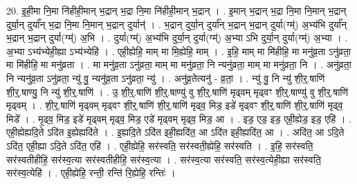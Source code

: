 \documentclass[17pt]{extarticle}
\begin{document}
20. इ॒ही॒मा नि॒मा नि॑हीही॒मान् भ॒द्रान् भ॒द्रा नि॒मा नि॑हीही॒मान् भ॒द्रान् । . इ॒मान् भ॒द्रान् भ॒द्रा नि॒मा नि॒मान् भ॒द्रान् दुर्या॒न् दुर्या᳚न् भ॒द्रा नि॒मा नि॒मान् भ॒द्रान् दुर्यान्॑ । . भ॒द्रान् दुर्या॒न् दुर्या᳚न् भ॒द्रान् भ॒द्रान् दुर्या(ग्म्॑) अ॒भ्य॑भि दुर्या᳚न् भ॒द्रान् भ॒द्रान् दुर्या(ग्म्॑) अ॒भि । . दुर्या(ग्म्॑) अ॒भ्य॑भि दुर्या॒न् दुर्या(ग्म्॑) अ॒भ्या ऽभि दुर्या॒न् दुर्या(ग्म्॑) अ॒भ्या । . अ॒भ्या ऽभ्य॑भ्येही॒ह्या ऽभ्य॑भ्येहि॑ । . एही॒ह्येहि॒ माम् मा मि॒ह्येहि॒ माम् । . इ॒हि॒ माम् मा मि॑हीहि॒ मा मनु॑व्र॒ता ऽनु॑व्रता॒ मा मि॑हीहि॒ मा मनु॑व्रता । . मा मनु॑व्र॒ता ऽनु॑व्रता॒ माम् मा मनु॑व्रता॒ नि न्यनु॑व्रता॒ माम् मा मनु॑व्रता॒ नि । . अनु॑व्रता॒ नि न्यनु॑व्र॒ता ऽनु॑व्रता॒ न्यु॑ वु॒ न्यनु॑व्र॒ता ऽनु॑व्रता॒ न्यु॑ । . अनु॑व्र॒तेत्यनु॑ - व्र॒ता॒ । . न्यु॑ वु॒ नि न्यु॑ शी॒र्॒.षाणि॑ शी॒र्॒.षाण्यु॒ नि न्यु॑ शी॒र्॒.षाणि॑ । . उ॒ शी॒र्॒.षाणि॑ शी॒र्॒.षाण्यु॑ वु शी॒र्॒.षाणि॑ मृढ्वम् मृढ्वꣳ शी॒र्॒.षाण्यु॑ वु शी॒र्॒.षाणि॑ मृढ्वम् । . शी॒र्॒.षाणि॑ मृढ्वम् मृढ्वꣳ शी॒र्॒.षाणि॑ शी॒र्॒.षाणि॑ मृढ्व॒ मिड॒ इडे॑ मृढ्वꣳ शी॒र्॒.षाणि॑ शी॒र्॒.षाणि॑ मृढ्व॒ मिडे᳚ । . मृ॒ढ्व॒ मिड॒ इडे॑ मृढ्वम् मृढ्व॒ मिड॒ एडे॑ मृढ्वम् मृढ्व॒ मिड॒ आ । . इड॒ एड॒ इड॒ एही॒ह्येड॒ इड॒ एहि॑ । . एही॒ह्येह्यदि॒ते ऽदि॑त इ॒ह्येह्यदि॑ते । . इ॒ह्यदि॒ते ऽदि॑त इही॒ह्यदि॑त॒ आ ऽदि॑त इही॒ह्यदि॑त॒ आ । . अदि॑त॒ आ ऽदि॒ते ऽदि॑त॒ एही॒ह्या ऽदि॒ते ऽदि॑त॒ एहि॑ । . एही॒ह्येहि॒ सर॑स्वति॒ सर॑स्वती॒ह्येहि॒ सर॑स्वति । . इ॒हि॒ सर॑स्वति॒ सर॑स्वतीहीहि॒ सर॑स्व॒त्या सर॑स्वतीहीहि॒ सर॑स्व॒त्या । . सर॑स्व॒त्या सर॑स्वति॒ सर॑स्व॒त्येही॒ह्या सर॑स्वति॒ सर॑स्व॒त्येहि॑ । . एही॒ह्येहि॒ रन्ती॒ रन्ति॑ रि॒ह्येहि॒ रन्तिः॑ । \newline
\end{document}

